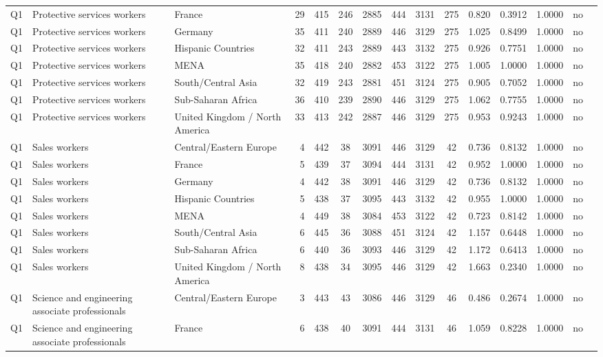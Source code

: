 \begin{longtable}{lllrcccccccccll}
Q1 & Protective services workers & France & 29 & 415 & 246 & 2885 & 444 & 3131 & 275 & 0.820 & 0.3912 & 1.0000 & no \\
Q1 & Protective services workers & Germany & 35 & 411 & 240 & 2889 & 446 & 3129 & 275 & 1.025 & 0.8499 & 1.0000 & no \\
Q1 & Protective services workers & Hispanic Countries & 32 & 411 & 243 & 2889 & 443 & 3132 & 275 & 0.926 & 0.7751 & 1.0000 & no \\
Q1 & Protective services workers & MENA & 35 & 418 & 240 & 2882 & 453 & 3122 & 275 & 1.005 & 1.0000 & 1.0000 & no \\
Q1 & Protective services workers & South/Central Asia & 32 & 419 & 243 & 2881 & 451 & 3124 & 275 & 0.905 & 0.7052 & 1.0000 & no \\
Q1 & Protective services workers & Sub-Saharan Africa & 36 & 410 & 239 & 2890 & 446 & 3129 & 275 & 1.062 & 0.7755 & 1.0000 & no \\
Q1 & Protective services workers & United Kingdom / North America & 33 & 413 & 242 & 2887 & 446 & 3129 & 275 & 0.953 & 0.9243 & 1.0000 & no \\
Q1 & Sales workers & Central/Eastern Europe & 4 & 442 & 38 & 3091 & 446 & 3129 & 42 & 0.736 & 0.8132 & 1.0000 & no \\
Q1 & Sales workers & France & 5 & 439 & 37 & 3094 & 444 & 3131 & 42 & 0.952 & 1.0000 & 1.0000 & no \\
Q1 & Sales workers & Germany & 4 & 442 & 38 & 3091 & 446 & 3129 & 42 & 0.736 & 0.8132 & 1.0000 & no \\
Q1 & Sales workers & Hispanic Countries & 5 & 438 & 37 & 3095 & 443 & 3132 & 42 & 0.955 & 1.0000 & 1.0000 & no \\
Q1 & Sales workers & MENA & 4 & 449 & 38 & 3084 & 453 & 3122 & 42 & 0.723 & 0.8142 & 1.0000 & no \\
Q1 & Sales workers & South/Central Asia & 6 & 445 & 36 & 3088 & 451 & 3124 & 42 & 1.157 & 0.6448 & 1.0000 & no \\
Q1 & Sales workers & Sub-Saharan Africa & 6 & 440 & 36 & 3093 & 446 & 3129 & 42 & 1.172 & 0.6413 & 1.0000 & no \\
Q1 & Sales workers & United Kingdom / North America & 8 & 438 & 34 & 3095 & 446 & 3129 & 42 & 1.663 & 0.2340 & 1.0000 & no \\
Q1 & Science and engineering associate professionals & Central/Eastern Europe & 3 & 443 & 43 & 3086 & 446 & 3129 & 46 & 0.486 & 0.2674 & 1.0000 & no \\
Q1 & Science and engineering associate professionals & France & 6 & 438 & 40 & 3091 & 444 & 3131 & 46 & 1.059 & 0.8228 & 1.0000 & no \\

\end{longtable}
